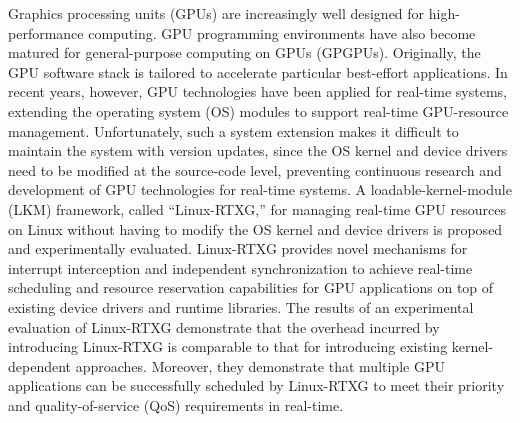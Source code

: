 Graphics processing units (GPUs) are increasingly well designed for high-performance computing.
GPU programming environments have also become matured for general-purpose computing on GPUs (GPGPUs).
Originally, the GPU software stack is tailored to accelerate particular best-effort applications.
In recent years, however, GPU technologies have been applied for real-time systems, extending the operating system (OS) modules to support real-time GPU-resource management.
Unfortunately, such a system extension makes it difficult to maintain the system with version updates, since the OS kernel and device drivers need to be modified at the source-code level, preventing continuous research and development of GPU technologies for real-time systems.
A loadable-kernel-module (LKM) framework, called ``Linux-RTXG,'' for managing real-time GPU resources on Linux without having to modify the OS kernel and device drivers is proposed and experimentally evaluated.
Linux-RTXG provides novel mechanisms for interrupt interception and independent synchronization to achieve real-time scheduling and resource reservation capabilities for GPU applications on top of existing device drivers and runtime libraries.
The results of an experimental evaluation of Linux-RTXG demonstrate that the overhead incurred by introducing Linux-RTXG is comparable to that for introducing existing kernel-dependent approaches.
Moreover, they demonstrate that multiple GPU applications can be successfully scheduled by Linux-RTXG to meet their priority and quality-of-service (QoS) requirements in real-time.
